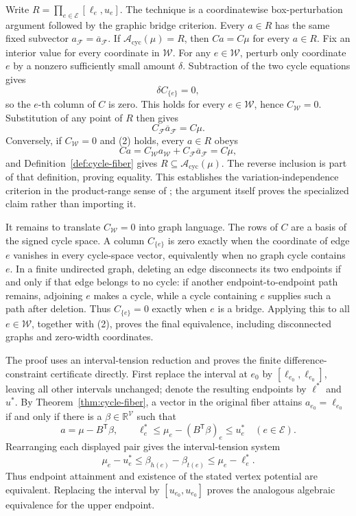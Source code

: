 Write \(R=\prod_{e\in\mathcal E}[\ell_e,u_e]\).  The technique is a coordinatewise box-perturbation argument followed by the graphic bridge criterion.  Every \(a\in R\) has the same fixed subvector \(a_{\mathcal F}=\overline a_{\mathcal F}\).  If \(\mathcal A_{\mathrm{cyc}}(\mu)=R\), then \(Ca=C\mu\) for every \(a\in R\).  Fix an interior value for every coordinate in \(\mathcal W\).  For any \(e\in\mathcal W\), perturb only coordinate \(e\) by a nonzero sufficiently small amount \(\delta\).  Subtraction of the two cycle equations gives
\[
 \delta C_{\{e\}}=0,
\]
so the \(e\)-th column of \(C\) is zero.  This holds for every \(e\in\mathcal W\), hence \(C_{\mathcal W}=0\).  Substitution of any point of \(R\) then gives
\[
 C_{\mathcal F}\overline a_{\mathcal F}=C\mu. \tag{2}
\]
Conversely, if \(C_{\mathcal W}=0\) and (2) holds, every \(a\in R\) obeys
\[
 Ca=C_{\mathcal W}a_{\mathcal W}+C_{\mathcal F}\overline a_{\mathcal F}=C\mu,
\]
and Definition~\ref{def:cycle-fiber} gives \(R\subseteq\mathcal A_{\mathrm{cyc}}(\mu)\).  The reverse inclusion is part of that definition, proving equality.  This establishes the variation-independence criterion in the product-range sense of \cite{Dawid2001}; the argument itself proves the specialized claim rather than importing it.

It remains to translate \(C_{\mathcal W}=0\) into graph language.  The rows of \(C\) are a basis of the signed cycle space.  A column \(C_{\{e\}}\) is zero exactly when the coordinate of edge \(e\) vanishes in every cycle-space vector, equivalently when no graph cycle contains \(e\).  In a finite undirected graph, deleting an edge disconnects its two endpoints if and only if that edge belongs to no cycle: if another endpoint-to-endpoint path remains, adjoining \(e\) makes a cycle, while a cycle containing \(e\) supplies such a path after deletion.  Thus \(C_{\{e\}}=0\) exactly when \(e\) is a bridge.  Applying this to all \(e\in\mathcal W\), together with (2), proves the final equivalence, including disconnected graphs and zero-width coordinates.

The proof uses an interval-tension reduction and proves the finite difference-constraint certificate directly.  First replace the interval at \(e_0\) by \([\ell_{e_0},\ell_{e_0}]\), leaving all other intervals unchanged; denote the resulting endpoints by \(\ell^*\) and \(u^*\).  By Theorem~\ref{thm:cycle-fiber}, a vector in the original fiber attains \(a_{e_0}=\ell_{e_0}\) if and only if there is a \(\beta\in\mathbb R^{\mathcal V}\) such that
\[
 a=\mu-B^{\mathsf T}\beta,
 \qquad
 \ell^*_e\le \mu_e-(B^{\mathsf T}\beta)_e\le u^*_e
 \quad(e\in\mathcal E).
\]
Rearranging each displayed pair gives the interval-tension system
\[
 \mu_e-u^*_e\le \beta_{h(e)}-\beta_{t(e)}
 \le \mu_e-\ell^*_e. \tag{3}
\]
Thus endpoint attainment and existence of the stated vertex potential are equivalent.  Replacing the interval by \([u_{e_0},u_{e_0}]\) proves the analogous algebraic equivalence for the upper endpoint.

